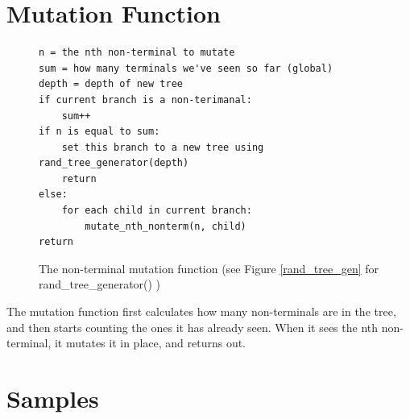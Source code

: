 \documentclass[12pt]{article}
\begin{document}
\section{Mutation Function}
\begin{figure}[!h]
        \begin{center}
		\scriptsize
		\begin{lstlisting}
n = the nth non-terminal to mutate
sum = how many terminals we've seen so far (global)
depth = depth of new tree
if current branch is a non-terimanal:
	sum++
if n is equal to sum:
	set this branch to a new tree using rand_tree_generator(depth)
	return
else:
	for each child in current branch:
		mutate_nth_nonterm(n, child)
return
		\end{lstlisting}
		\normalsize
               \caption{The non-terminal mutation function (see Figure \ref{rand_tree_gen} for rand\_tree\_generator() ) }
                \label{nonterm_mut_func}
        \end{center}
\end{figure}

The mutation function first calculates how many non-terminals are in the tree, and then starts counting the ones it has already seen. When it sees the nth non-terminal, it mutates it in place, and returns out.


\pagebreak

\section{Samples}
\end{document}
